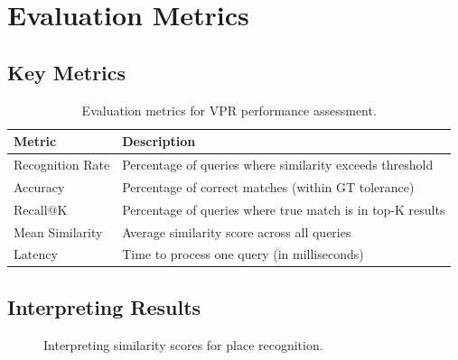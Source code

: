\documentclass[11pt,a4paper]{article}
\begin{document}
\newpage
\section{Evaluation Metrics}

\subsection{Key Metrics}

\begin{table}[H]
    \centering
    \begin{tabular}{lp{8cm}}
        \toprule
        \textbf{Metric} & \textbf{Description} \\
        \midrule
        Recognition Rate & Percentage of queries where similarity exceeds threshold \\
        Accuracy & Percentage of correct matches (within GT tolerance) \\
        Recall@K & Percentage of queries where true match is in top-K results \\
        Mean Similarity & Average similarity score across all queries \\
        Latency & Time to process one query (in milliseconds) \\
        \bottomrule
    \end{tabular}
    \caption{Evaluation metrics for VPR performance assessment.}
\end{table}

\subsection{Interpreting Results}

\begin{figure}[H]
    \centering
    \caption{Interpreting similarity scores for place recognition.}
\end{figure}
\end{document}
